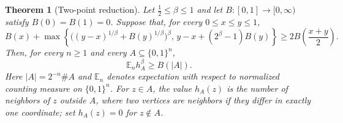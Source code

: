 \documentclass[11pt]{amsart}
\newtheorem{theorem}{Theorem}
\newcommand{\E}{\mathbb E}
\begin{document}
\begin{theorem}[Two-point reduction]\label{thm:two-point}
Let $\frac12\le\beta\le1$ and let $B:[0,1]\to[0,\infty)$ satisfy
$B(0)=B(1)=0$. Suppose that, for every $0\le x\le y\le1$,
\begin{equation}\label{eq:two-point}
 B(x)+\max\left\{
 \bigl((y-x)^{1/\beta}+B(y)^{1/\beta}\bigr)^\beta,\,
 y-x+(2^\beta-1)B(y)
 \right\}
 \ge 2B\!\left(\frac{x+y}{2}\right).
\end{equation}
Then, for every $n\ge1$ and every $A\subseteq\{0,1\}^n$,
\[
 \E_n h_A^\beta\ge B(|A|).
\]
Here $|A|=2^{-n}\#A$ and $\E_n$ denotes expectation with respect to
normalized counting measure on $\{0,1\}^n$. For $z\in A$, the value
$h_A(z)$ is the number of neighbors of $z$ outside $A$, where two
vertices are neighbors if they differ in exactly one coordinate;
set $h_A(z)=0$ for $z\notin A$.
\end{theorem}
\end{document}
